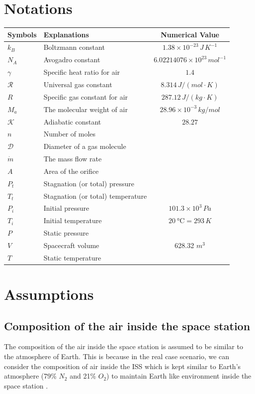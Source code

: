 \documentclass[a4paper, 14pt]{extarticle}
\begin{document}
\section{Notations}
\begin{table}[H]
\centering
\def\arraystretch{1.4}
\begin{tabular}{lp{3in}c}
\hline
Symbols & Explanations & Numerical Value \\ \hline
$k_B$ & Boltzmann constant & $1.38 \times 10^{-23}\,J\,K^{-1}$ \\
$N_A$ & Avogadro constant & $6.02214076\times 10^{23}\,mol^{-1}$ \\
$\gamma$ & Specific heat ratio for air & $1.4$ \\
$\mathcal{R}$ & Universal gas constant & $8.314 \, J/(mol \cdot K)$ \\
$R$ & Specific gas constant for air & $287.12 \, J/(kg \cdot K)$ \\
$M_a$ & The molecular weight of air & $28.96\times 10^{-3} \, kg/mol$ \\
$\mathcal{K}$ & Adiabatic constant & $28.27$ \\
$n$ & Number of moles & \\
$\mathcal{D}$ & Diameter of a gas molecule & \\
$\dot{m}$ & The mass flow rate & \\
$A$ & Area of the orifice & \\
$P_t$ & Stagnation (or total) pressure & \\
$T_t$ & Stagnation (or total) temperature &  \\
$P_i$ & Initial pressure & $101.3\times 10^3 \, Pa$ \\
$T_i$ & Initial temperature & $\SI{20}{\degreeCelsius}=293\,K$  \\
$P$ & Static pressure & \\
$V$ & Spacecraft volume & 628.32 $m^3$ \\
$T$ & Static temperature &  \\
\hline
\end{tabular}
\end{table}
\section{Assumptions}
\subsection{Composition of the air inside the space station}
The composition of the air inside the space station is assumed to be similar to the atmosphere of Earth. This is because in the real case scenario, we can consider the composition of air inside the ISS which is kept similar to Earth's atmosphere (79\% $N_2$ and 21\% $O_2$) to maintain Earth like environment inside the space station \citep{wiki2024}.
\end{document}
